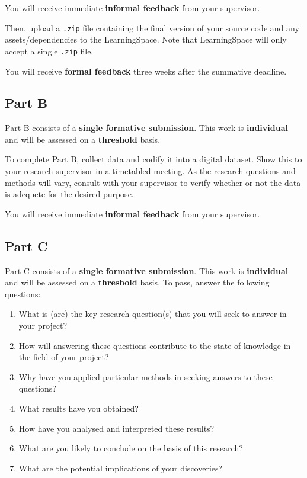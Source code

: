 You will receive immediate \textbf{informal feedback} from your supervisor.

Then, upload a \texttt{.zip} file containing the final version of your source code and any assets/dependencies to the LearningSpace.
Note that LearningSpace will only accept a single \texttt{.zip} file.

You will receive \textbf{formal feedback} three weeks after the summative deadline.

\subsection*{Part B}

Part B consists of a \textbf{single formative submission}.
This work is \textbf{individual} and will be assessed on a \textbf{threshold} basis.

To complete Part B, collect data and codify it into a digital dataset. Show this to your research supervisor in a timetabled meeting. 
As the research questions and methods will vary, consult with your supervisor to verify whether or not the
data is adequete for the desired purpose.

You will receive immediate \textbf{informal feedback} from your supervisor.


\subsection*{Part C}

Part C consists of a \textbf{single formative submission}.
This work is \textbf{individual} and will be assessed on a \textbf{threshold} basis.
To pass, answer the following questions:

\begin{enumerate}[label=(\roman*)]
	\item What is (are) the key research question(s) that you will seek to answer in your project?
	\item How will answering these questions contribute to the state of knowledge in the field of your project?
	\item Why have you applied particular methods in seeking answers to these questions?
	\item What results have you obtained?
	\item How have you analysed and interpreted these results?
	\item What are you likely to conclude on the basis of this research?
	\item What are the potential implications of your discoveries?
\end{enumerate}

